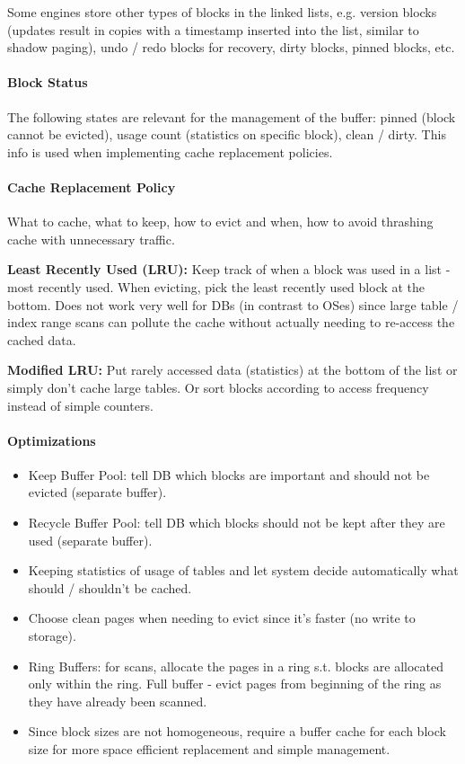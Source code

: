 Some engines store other types of blocks in the linked lists, e.g. version blocks (updates result in copies with a timestamp inserted into the list, similar to shadow paging), undo / redo blocks for recovery, dirty blocks, pinned blocks, etc.

\paragraph{Block Status}
The following states are relevant for the management of the buffer: pinned (block cannot be evicted), usage count (statistics on specific block), clean / dirty. This info is used when implementing cache replacement policies. 

\paragraph{Cache Replacement Policy}
What to cache, what to keep, how to evict and when, how to avoid thrashing cache with unnecessary traffic.

\textbf{Least Recently Used (LRU):} Keep track of when a block was used in a list - most recently used. When evicting, pick the least recently used block at the bottom. Does not work very well for DBs (in contrast to OSes) since large table / index range scans can pollute the cache without actually needing to re-access the cached data.

\textbf{Modified LRU:} Put rarely accessed data (statistics) at the bottom of the list or simply don't cache large tables. Or sort blocks according to access frequency instead of simple counters.

\paragraph{Optimizations}
\begin{itemize}
    \item Keep Buffer Pool: tell DB which blocks are important and should not be evicted (separate buffer).
    \item Recycle Buffer Pool: tell DB which blocks should not be kept after they are used (separate buffer).
    \item Keeping statistics of usage of tables and let system decide automatically what should / shouldn't be cached.
    \item Choose clean pages when needing to evict since it's faster (no write to storage).
    \item Ring Buffers: for scans, allocate the pages in a ring s.t. blocks are allocated only within the ring. Full buffer - evict pages from beginning of the ring as they have already been scanned.
    \item Since block sizes are not homogeneous, require a buffer cache for each block size for more space efficient replacement and simple management.
\end{itemize}

